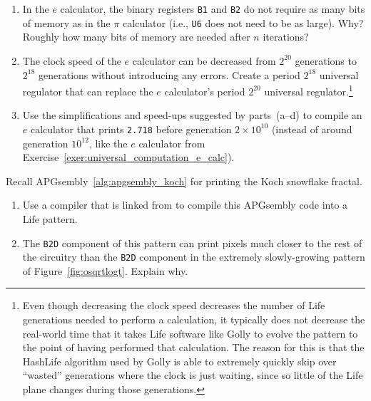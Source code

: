 \begin{multicols}{2}
\begin{problem}
\begin{enumerate}[label=\bf\color{ocre}(\alph*)]
			\item In the $e$ calculator, the binary registers \texttt{B1} and \texttt{B2} do not require as many bits of memory as in the $\pi$ calculator (i.e., \texttt{U6} does not need to be as large). Why? Roughly how many bits of memory are needed after $n$ iterations?
			
			\item The  clock speed of the $e$ calculator can be decreased from $2^{20}$ generations to $2^{18}$ generations without introducing any errors. Create a period $2^{18}$ universal regulator that can replace the $e$ calculator's period $2^{20}$ universal regulator.\footnote{Even though decreasing the clock speed decreases the number of Life generations needed to perform a calculation, it typically does not decrease the real-world time that it takes Life software like Golly to evolve the pattern to the point of having performed that calculation. The reason for this is that the HashLife algorithm used by Golly is able to extremely quickly skip over ``wasted'' generations where the clock is just waiting, since so little of the Life plane changes during those generations.}
			
			\item Use the simplifications and speed-ups suggested by parts~(a--d) to compile an $e$ calculator that prints \texttt{2.718} before generation $2\times 10^{10}$ (instead of around generation $10^{12}$, like the $e$ calculator from Exercise~\ref{exer:universal_computation_e_calc}).
		\end{enumerate}
	\end{problem}


	\mfilbreak
	
	
	\begin{problem}\label{exer:universal_computation_b2d_why_far}
		Recall APGsembly~\ref{alg:apgsembly_koch} for printing the Koch snowflake fractal.\smallskip
		
		\begin{enumerate}[label=\bf\color{ocre}(\alph*)]
			\item {} Use a compiler that is linked from  to compile this APGsembly code into a Life pattern.
			
			\item {} The \texttt{B2D} component of this pattern can print pixels much closer to the rest of the circuitry than the \texttt{B2D} component in the extremely slowly-growing pattern of Figure~\ref{fig:osqrtlogt}. Explain why.
		\end{enumerate}
	\end{problem}
	

\end{multicols}
